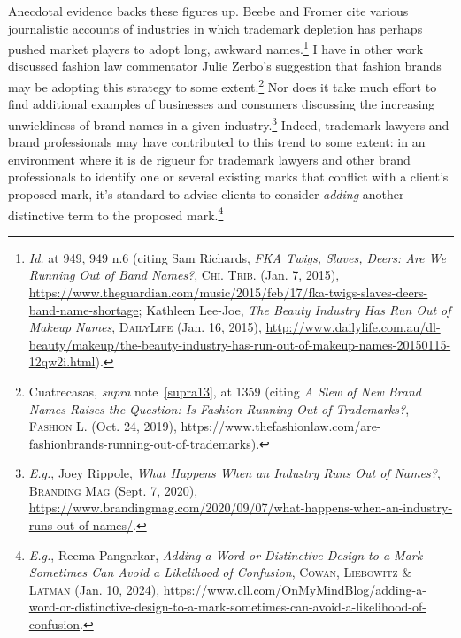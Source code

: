 \documentclass[letterpaper, 11pt, oneside]{article}
\begin{document}
Anecdotal evidence backs these figures up. Beebe and Fromer cite various journalistic accounts of industries in which trademark depletion has perhaps pushed market players to adopt long, awkward names.\footnote{\textit{Id.} at 949, 949 n.6 (citing Sam Richards, \textit{FKA Twigs, Slaves, Deers: Are We Running Out of Band Names?}, \textsc{Chi. Trib.} (Jan. 7, 2015), \url{https://www.theguardian.com/music/2015/feb/17/fka-twigs-slaves-deers-band-name-shortage}; Kathleen Lee-Joe, \textit{The Beauty Industry Has Run Out of Makeup Names}, \textsc{DailyLife} (Jan. 16, 2015), \url{http://www.dailylife.com.au/dl-beauty/makeup/the-beauty-industry-has-run-out-of-makeup-names-20150115-12qw2i.html}).} I have in other work discussed fashion law commentator Julie Zerbo's suggestion that fashion brands may be adopting this strategy to some extent.\footnote{Cuatrecasas, \textit{supra} note~\ref{supra13}, at 1359 (citing \textit{A Slew of New Brand Names Raises the Question: Is Fashion Running Out of Trademarks?}, \textsc{Fashion L.} (Oct. 24, 2019), https://www.thefashionlaw.com/are-fashionbrands-running-out-of-trademarks).} Nor does it take much effort to find additional examples of businesses and consumers discussing the increasing unwieldiness of brand names in a given industry.\footnote{\textit{E.g.}, Joey Rippole, \textit{What Happens When an Industry Runs Out of Names?}, \textsc{Branding Mag} (Sept. 7, 2020), \url{https://www.brandingmag.com/2020/09/07/what-happens-when-an-industry-runs-out-of-names/}.} Indeed, trademark lawyers and brand professionals may have contributed to this trend to some extent: in an environment where it is de rigueur for trademark lawyers and other brand professionals to identify one or several existing marks that conflict with a client's proposed mark, it's standard to advise clients to consider \textit{adding} another distinctive term to the proposed mark.\footnote{\textit{E.g.}, Reema Pangarkar, \textit{Adding a Word or Distinctive Design to a Mark Sometimes Can Avoid a Likelihood of Confusion}, \textsc{Cowan, Liebowitz \& Latman} (Jan. 10, 2024), \url{https://www.cll.com/OnMyMindBlog/adding-a-word-or-distinctive-design-to-a-mark-sometimes-can-avoid-a-likelihood-of-confusion}.}
\end{document}
